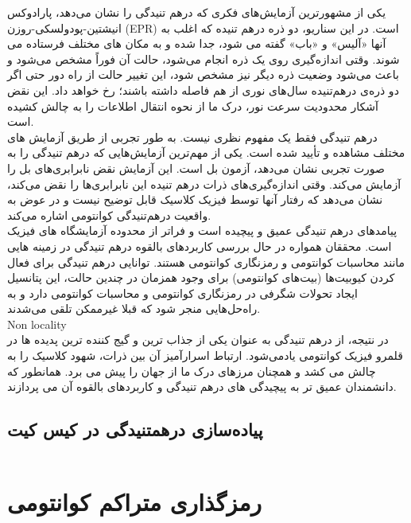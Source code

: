 \documentclass{book}
\begin{document}
یکی از مشهورترین آزمایش‌های فکری که درهم تنیدگی را نشان می‌دهد، پارادوکس انیشتین-پودولسکی-روزن (EPR) است. در این سناریو، دو ذره درهم تنیده که اغلب به آنها «آلیس» و «باب» گفته می شود، جدا شده و به مکان های مختلف فرستاده می شوند. وقتی اندازه‌گیری روی یک ذره انجام می‌شود، حالت آن فوراً مشخص می‌شود و باعث می‌شود وضعیت ذره دیگر نیز مشخص شود، این تغییر حالت از راه دور حتی اگر دو ذره‌ی درهم‌تنیده سال‌های نوری از هم فاصله داشته باشند؛ رخ خواهد داد. این نقض آشکار محدودیت سرعت نور، درک ما از نحوه انتقال اطلاعات را به چالش کشیده است.\\

درهم تنیدگی فقط یک مفهوم نظری نیست. به طور تجربی از طریق آزمایش های مختلف مشاهده و تأیید شده است. یکی از مهم‌ترین آزمایش‌هایی که درهم تنیدگی را به صورت تجربی نشان می‌دهد، آزمون بل است.
این آزمایش نقض نابرابری‌های بل را آزمایش می‌کند. وقتی اندازه‌گیری‌های ذرات درهم تنیده این نابرابری‌ها را نقض می‌کند، نشان می‌دهد که رفتار آنها توسط فیزیک کلاسیک قابل توضیح نیست و در عوض به واقعیت درهم‌تنیدگی کوانتومی اشاره می‌کند.\\

پیامدهای درهم تنیدگی عمیق و پیچیده است و فراتر از محدوده آزمایشگاه های فیزیک است. محققان همواره در حال بررسی کاربردهای بالقوه درهم تنیدگی در زمینه هایی مانند محاسبات کوانتومی و رمزنگاری کوانتومی هستند. توانایی درهم تنیدگی برای فعال کردن کیوبیت‌ها (بیت‌های کوانتومی) برای وجود همزمان در چندین حالت، این پتانسیل ایجاد تحولات شگرفی در رمزنگاری کوانتومی و محاسبات کوانتومی دارد و به راه‌حل‌هایی منجر شود که قبلا غیرممکن تلقی می‌شدند.\\

Non locality \\ 

در نتیجه، از درهم تنیدگی به عنوان یکی از جذاب ترین و گیج کننده ترین پدیده ها در قلمرو فیزیک کوانتومی یاد‌می‌شود. ارتباط اسرارآمیز آن بین ذرات، شهود کلاسیک را به چالش می کشد و همچنان مرزهای درک ما از جهان را پیش می برد. همانطور که دانشمندان عمیق تر به پیچیدگی های درهم تنیدگی و کاربردهای بالقوه آن می پردازند.
\subsection{پیاده‌سازی درهمتنیدگی در کیس کیت}
\begin{verbatim}

\end{verbatim}
\newpage



\section{رمزگذاری متراکم کوانتومی}
\end{document}
